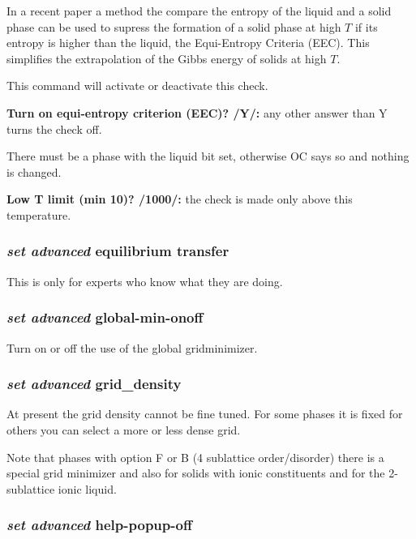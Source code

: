 \documentclass[11pt]{article}
\begin{document}
In a recent paper\cite{20Sun} a method the compare the entropy of
the liquid and a solid phase can be used to supress the formation of a
solid phase at high $T$ if its entropy is higher than the liquid, the
Equi-Entropy Criteria (EEC).  This simplifies the extrapolation of the
Gibbs energy of solids at high $T$.

This command will activate or deactivate this check.

{\bf Turn on equi-entropy criterion (EEC)? /Y/:} any other answer than
Y turns the check off.

There must be a phase with the liquid bit set, otherwise OC says so
and nothing is changed.

{\bf Low T limit (min 10)? /1000/:} the check is made only above this
temperature.

\hypertarget{Set adv transfer}{}
\subsubsection{{\em set advanced} equilibrium transfer}

This is only for experts who know what they are doing.

\hypertarget{Set adv global onoff}{}
\subsubsection{{\em set advanced} global-min-onoff}

Turn on or off the use of the global gridminimizer.

\hypertarget{Set adv grid-density}{}
\subsubsection{{\em set advanced} grid\_density}

At present the grid density cannot be fine tuned.  For some phases it
is fixed for others you can select a more or less dense grid.

Note that phases with option F or B (4 sublattice order/disorder)
there is a special grid minimizer and also for solids with ionic
constituents and for the 2-sublattice ionic liquid.

\hypertarget{Set adv help popup}{}
\subsubsection{{\em set advanced} help-popup-off}\label{sc:help-popup}
\end{document}
